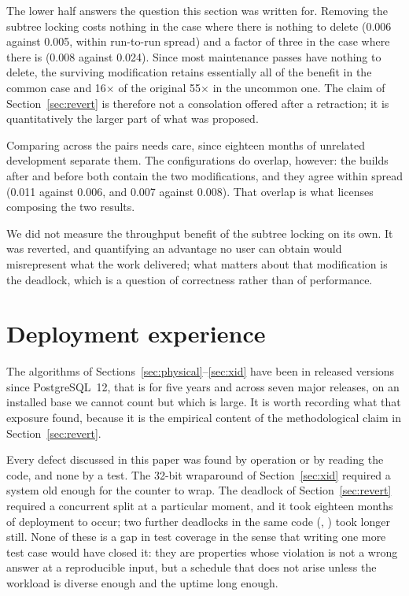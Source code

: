 The lower half answers the question this section was written for. Removing the
subtree locking costs nothing in the case where there is nothing to delete
(0.006 against 0.005, within run-to-run spread) and a factor of three in the case
where there is (0.008 against 0.024). Since most maintenance passes have nothing
to delete, the surviving modification retains essentially all of the benefit in
the common case and 16$\times$ of the original 55$\times$ in the uncommon one. The
claim of Section~\ref{sec:revert} is therefore not a consolation offered after a
retraction; it is quantitatively the larger part of what was proposed.

Comparing across the pairs needs care, since eighteen months of unrelated
development separate them. The configurations do overlap, however: the builds
after  and before  both contain the two
modifications, and they agree within spread (0.011 against 0.006, and 0.007
against 0.008). That overlap is what licenses composing the two results.

We did not measure the throughput benefit of the subtree locking on its own. It
was reverted, and quantifying an advantage no user can obtain would misrepresent
what the work delivered; what matters about that modification is the deadlock,
which is a question of correctness rather than of performance.



\section{Deployment experience}
\label{sec:deployment}

The algorithms of Sections~\ref{sec:physical}--\ref{sec:xid} have been in
released versions since PostgreSQL~12, that is for five years and across seven
major releases, on an installed base we cannot count but which is large. It is
worth recording what that exposure found, because it is the empirical content of
the methodological claim in Section~\ref{sec:revert}.

Every defect discussed in this paper was found by operation or by reading the
code, and none by a test.
The 32-bit wraparound of Section~\ref{sec:xid} required a system old enough for
the counter to wrap. The deadlock of Section~\ref{sec:revert} required a
concurrent split at a particular moment, and it took eighteen months of
deployment to occur; two further deadlocks in the same code
(, ) took longer still. None of these is a
gap in test coverage in the sense that writing one more test case would have
closed it: they are properties whose violation is not a wrong answer at a
reproducible input, but a schedule that does not arise unless the workload is
diverse enough and the uptime long enough.


